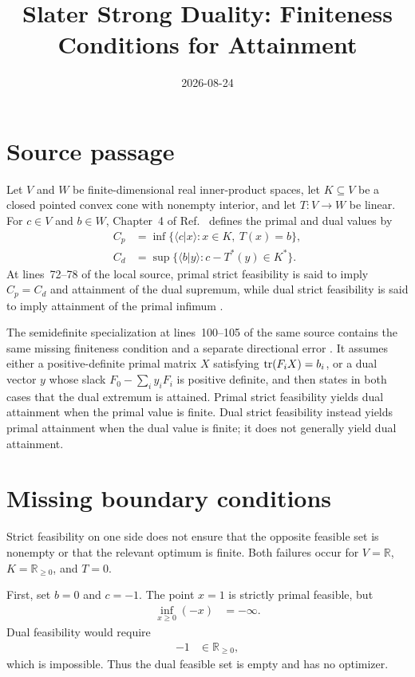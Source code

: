\documentclass{article}
\title{Slater Strong Duality: Finiteness Conditions for Attainment}
\author{}
\date{2026-08-24}
\begin{document}
\maketitle
{}

\section{Source passage}

Let $V$ and $W$ be finite-dimensional real inner-product spaces, let
$K\subseteq V$ be a closed pointed convex cone with nonempty interior, and let
$T:V\to W$ be linear. For $c\in V$ and $b\in W$, Chapter~4 of
Ref.~\cite{Wolf2012Quantum} defines the primal and dual values by
\begin{align}
  C_p
    &=\inf\{\langle c|x\rangle:x\in K,\ T(x)=b\},
  \label{eq:wolf_slater_attainment_conditions_primal_value}\\
  C_d
    &=\sup\{\langle b|y\rangle:c-T^*(y)\in K^*\}.
  \label{eq:wolf_slater_attainment_conditions_dual_value}
\end{align}
At lines~72--78 of the local source, primal strict feasibility is said to imply
$C_p=C_d$ and attainment of the dual supremum, while dual strict feasibility
is said to imply attainment of the primal infimum
\cite[Chapter~4]{Wolf2012Quantum}.

The semidefinite specialization at lines~100--105 of the same source contains
the same missing finiteness condition and a separate directional error
\cite[Chapter~4]{Wolf2012Quantum}. It assumes either a positive-definite primal
matrix $X$ satisfying $\operatorname{tr}(F_iX)=b_i$, or a dual vector $y$ whose slack
$F_0-\sum_i y_iF_i$ is positive definite, and then states in both cases that
the dual extremum is attained. Primal strict feasibility yields dual
attainment when the primal value is finite. Dual strict feasibility instead
yields primal attainment when the dual value is finite; it does not generally
yield dual attainment.

\section{Missing boundary conditions}

Strict feasibility on one side does not ensure that the opposite feasible set
is nonempty or that the relevant optimum is finite. Both failures occur for
$V=\mathbb R$, $K=\mathbb R_{\geq0}$, and $T=0$.

First, set $b=0$ and $c=-1$. The point $x=1$ is strictly primal feasible, but
\begin{align}
  \inf_{x\geq0}(-x)
    &=-\infty.
  \label{eq:wolf_slater_attainment_conditions_unbounded_primal}
\end{align}
Dual feasibility would require
\begin{align}
  -1
    &\in\mathbb R_{\geq0},
  \label{eq:wolf_slater_attainment_conditions_empty_dual_requirement}
\end{align}
which is impossible. Thus the dual feasible set is empty and has no optimizer.
\end{document}
